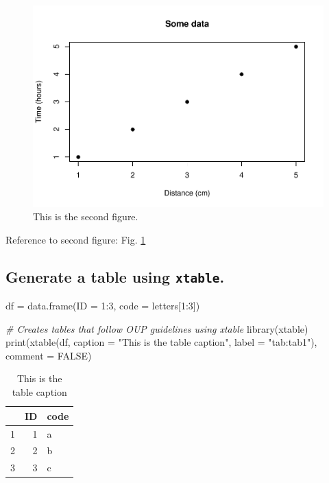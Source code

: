 \documentclass[12pt,halfline,a4paper,]{ouparticle}
\newenvironment{Shaded}{\begin{snugshade}}{\end{snugshade}}
\newcommand{\AttributeTok}[1]{\textcolor[rgb]{0.77,0.63,0.00}{#1}}
\newcommand{\CommentTok}[1]{\textcolor[rgb]{0.56,0.35,0.01}{\textit{#1}}}
\newcommand{\ConstantTok}[1]{\textcolor[rgb]{0.00,0.00,0.00}{#1}}
\newcommand{\DecValTok}[1]{\textcolor[rgb]{0.00,0.00,0.81}{#1}}
\newcommand{\FunctionTok}[1]{\textcolor[rgb]{0.00,0.00,0.00}{#1}}
\newcommand{\NormalTok}[1]{#1}
\newcommand{\OtherTok}[1]{\textcolor[rgb]{0.56,0.35,0.01}{#1}}
\newcommand{\SpecialCharTok}[1]{\textcolor[rgb]{0.00,0.00,0.00}{#1}}
\newcommand{\StringTok}[1]{\textcolor[rgb]{0.31,0.60,0.02}{#1}}
\begin{document}
\begin{figure}[H]
\includegraphics[width=1\linewidth]{assignment_template_files/figure-latex/fig2-1} \caption{This is the second figure.}\label{fig:fig2}
\end{figure}

Reference to second figure: Fig. \ref{fig:fig2}

\hypertarget{generate-a-table-using-xtable.}{%
\subsection{\texorpdfstring{Generate a table using
\texttt{xtable}.}{Generate a table using xtable.}}\label{generate-a-table-using-xtable.}}

\begin{Shaded}
\begin{Highlighting}[]
\NormalTok{df }\OtherTok{=} \FunctionTok{data.frame}\NormalTok{(}\AttributeTok{ID =} \DecValTok{1}\SpecialCharTok{:}\DecValTok{3}\NormalTok{, }\AttributeTok{code =}\NormalTok{ letters[}\DecValTok{1}\SpecialCharTok{:}\DecValTok{3}\NormalTok{])}

\CommentTok{\# Creates tables that follow OUP guidelines using xtable}
\FunctionTok{library}\NormalTok{(xtable) }
\FunctionTok{print}\NormalTok{(}\FunctionTok{xtable}\NormalTok{(df, }\AttributeTok{caption =} \StringTok{"This is the table caption"}\NormalTok{, }
             \AttributeTok{label =} \StringTok{"tab:tab1"}\NormalTok{), }\AttributeTok{comment =} \ConstantTok{FALSE}\NormalTok{)}
\end{Highlighting}
\end{Shaded}

\begin{table}[ht]
\centering
\begin{tabular}{rrl}
  \hline
 & ID & code \\ 
  \hline
1 &   1 & a \\ 
  2 &   2 & b \\ 
  3 &   3 & c \\ 
   \hline
\end{tabular}
\caption{This is the table caption} 
\label{tab:tab1}
\end{table}
\end{document}
